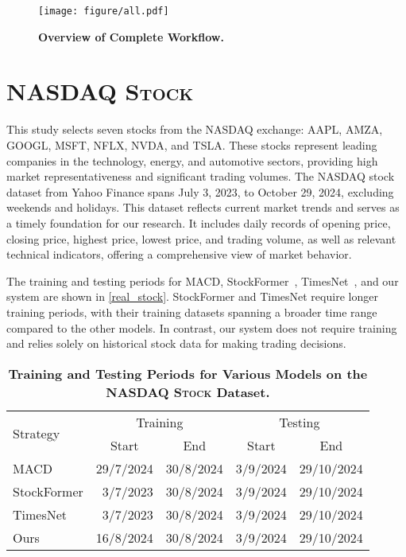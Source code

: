 \begin{figure*}
	\centering
	\texttt{[image: figure/all.pdf]}
	\caption{\textbf{Overview of Complete Workflow.}}
	\label{fig:diagram}
\end{figure*}

\section{\textsc{NASDAQ Stock}}
\label{appendix_NASDAQ}

This study selects seven stocks from the NASDAQ exchange: AAPL, AMZA, GOOGL, MSFT, NFLX, NVDA, and TSLA. These stocks represent leading companies in the technology, energy, and automotive sectors, providing high market representativeness and significant trading volumes. The NASDAQ stock dataset from Yahoo Finance spans July 3, 2023, to October 29, 2024, excluding weekends and holidays. This dataset reflects current market trends and serves as a timely foundation for our research. It includes daily records of opening price, closing price, highest price, lowest price, and trading volume, as well as relevant technical indicators, offering a comprehensive view of market behavior.

The training and testing periods for MACD, StockFormer~\citep{stockformer}, TimesNet~\citep{timesnet}, 
and our system are shown in \autoref{real_stock}. StockFormer and TimesNet require longer training periods, with their training datasets spanning a broader time range compared to the other models. In contrast, our system does not require training and relies solely on historical stock data for making trading decisions. 

\begin{table}[ht]
	\centering
	\footnotesize
	\setlength{\tabcolsep}{2.5pt}
	\begin{tabular}{lrccc}
	\toprule[1.1pt]
	\multirow{2}{*}{Strategy} & \multicolumn{2}{c}{Training} & \multicolumn{2}{c}{Testing} \\
	\cmidrule(lr){2-3} \cmidrule(lr){4-5}
	& \multicolumn{1}{c}{Start} & End & Start & End \\
	\midrule
	MACD & 29/7/2024 & 30/8/2024 & 3/9/2024 & 29/10/2024 \\
	StockFormer & 3/7/2023 & 30/8/2024 & 3/9/2024 & 29/10/2024 \\
	TimesNet & 3/7/2023 & 30/8/2024 & 3/9/2024 & 29/10/2024 \\
	Ours & 16/8/2024 & 30/8/2024 & 3/9/2024 & 29/10/2024 \\
	\bottomrule[1.1pt]
	\end{tabular}
	\caption{\textbf{Training and Testing Periods for Various Models on the \textsc{NASDAQ Stock} Dataset.}}
	\label{real_stock}
\end{table}

